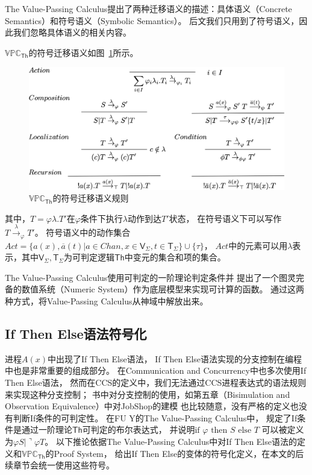 The Value-Passing Calculus提出了两种迁移语义的描述：具体语义（Concrete Semantics）和符号语义（Symbolic Semantics）。
后文我们只用到了符号语义，因此我们忽略具体语义的相关内容。

$\mathbb{VPC}_{\mathsf{Th}}$的符号迁移语义如图~\ref{fig_vpc}所示。

\begin{figure}[!htbp]
   \small
   \centering
   \includegraphics[width=13cm]{../figures/vpc.png}
    \caption[]{$\mathbb{VPC}_{\mathsf{Th}}$的符号迁移语义规则}
    \label{fig_vpc}
\end{figure}
其中，$T=\varphi \lambda.T'$在$\varphi$条件下执行$\lambda$动作到达$T'$状态，
在符号语义下可以写作$T\stackrel{\lambda}{\rightarrow}_{\varphi}T'$。
符号语义中的动作集合$Act=\{a(x),\overline{a}(t)| a\in Chan, x\in \mathsf{V}_{\Sigma}, t\in \mathsf{T}_{\Sigma}\}\cup \{\tau\}$，
$Act$中的元素可以用$\lambda$表示，其中$\mathsf{V}_{\Sigma},\mathsf{T}_{\Sigma}$为可判定逻辑$\mathsf{Th}$中变元的集合和项的集合\cite{Fu_VPC}。

The Value-Passing Calculus使用可判定的一阶理论判定条件\cite{PA}并
提出了一个图灵完备的数值系统（Numeric System）\cite{Fu_VPC}作为底层模型来实现可计算的函数。
通过这两种方式，将Value-Passing Calculus从神域中解放出来。

\subsection{If Then Else语法符号化}
进程$A(x)$中出现了If Then Else语法，
If Then Else语法实现的分支控制在编程中也是非常重要的组成部分。
在Communication and Concurrency\cite{Milner_CCS}中也多次使用If Then Else语法，
然而在CCS的定义中，我们无法通过CCS进程表达式的语法规则来实现这种分支控制；
书中对分支控制的使用，如第五章（Bisimulation and Observation Equivalence）中对JobShop的建模\cite{Milner_CCS}
也比较随意，没有严格的定义也没有判断If条件的可判定性。
在FU Y的The Value-Passing Calculus\cite{Fu_VPC}中，
规定了If条件是通过一阶理论$\mathsf{Th}$可判定的布尔表达式，
并说明$\textrm{if }\varphi\textrm{ then }S\textrm{ else }T$
可以被定义为$\varphi S|\urcorner \varphi T$。
以下推论依据The Value-Passing Calculus中对If Then Else语法的定义和$\mathbb{VPC}_{\mathsf{Th}}$的Proof System，
给出If Then Else的变体的符号化定义，在本文的后续章节会统一使用这些符号。

